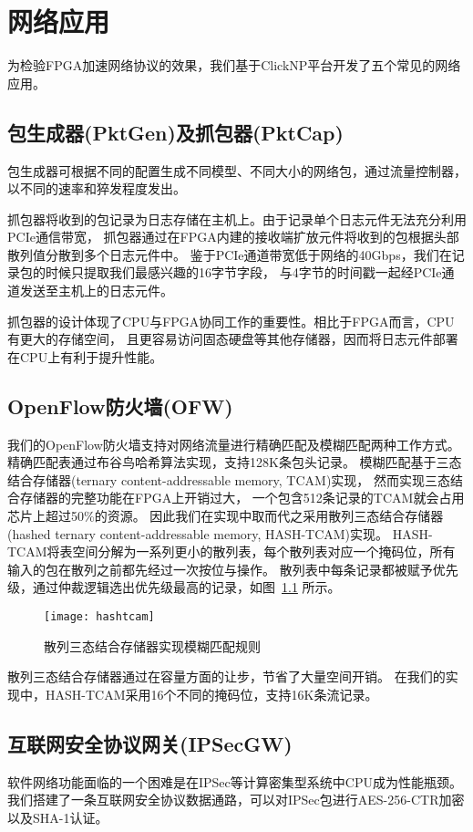 \chapter{网络应用}
为检验FPGA加速网络协议的效果，我们基于ClickNP平台开发了五个常见的网络应用。

\section{包生成器(PktGen)及抓包器(PktCap)}
包生成器可根据不同的配置生成不同模型、不同大小的网络包，通过流量控制器，以不同的速率和猝发程度发出。

抓包器将收到的包记录为日志存储在主机上。由于记录单个日志元件无法充分利用PCIe通信带宽，
抓包器通过在FPGA内建的接收端扩放元件将收到的包根据头部散列值分散到多个日志元件中。
鉴于PCIe通道带宽低于网络的40Gbps，我们在记录包的时候只提取我们最感兴趣的16字节字段，
与4字节的时间戳一起经PCIe通道发送至主机上的日志元件。

抓包器的设计体现了CPU与FPGA协同工作的重要性。相比于FPGA而言，CPU有更大的存储空间，
且更容易访问固态硬盘等其他存储器，因而将日志元件部署在CPU上有利于提升性能。

\section{OpenFlow防火墙(OFW)}
我们的OpenFlow防火墙支持对网络流量进行精确匹配及模糊匹配两种工作方式。
精确匹配表通过布谷鸟哈希算法实现，支持128K条包头记录。
模糊匹配基于三态结合存储器(ternary content-addressable memory, TCAM)实现，
然而实现三态结合存储器的完整功能在FPGA上开销过大，
一个包含512条记录的TCAM就会占用芯片上超过50\%的资源。
因此我们在实现中取而代之采用散列三态结合存储器(hashed ternary content-addressable memory, HASH-TCAM)实现。
HASH-TCAM将表空间分解为一系列更小的散列表，每个散列表对应一个掩码位，所有输入的包在散列之前都先经过一次按位与操作。
散列表中每条记录都被赋予优先级，通过仲裁逻辑选出优先级最高的记录，如图~\ref{fig:hashtcam} 所示。
\begin{figure}[htbp]
\centering
\texttt{[image: hashtcam]}
\caption{散列三态结合存储器实现模糊匹配规则} \label{fig:hashtcam}
\end{figure}

散列三态结合存储器通过在容量方面的让步，节省了大量空间开销。
在我们的实现中，HASH-TCAM采用16个不同的掩码位，支持16K条流记录。

\section{互联网安全协议网关(IPSecGW)}
软件网络功能面临的一个困难是在IPSec等计算密集型系统中CPU成为性能瓶颈。
我们搭建了一条互联网安全协议数据通路，可以对IPSec包进行AES-256-CTR加密以及SHA-1认证。

